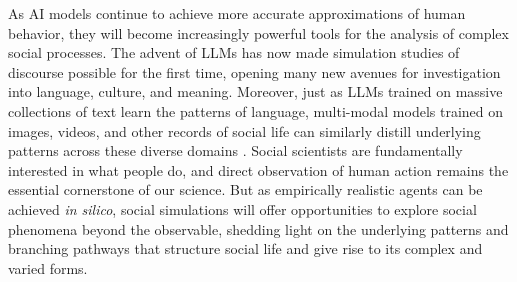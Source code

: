 \documentclass{article} %
\begin{document}
As AI models continue to achieve more accurate approximations of human
behavior, they will become increasingly powerful tools for the analysis
of complex social processes. The advent of LLMs has now made simulation
studies of discourse possible for the first time, opening many new
avenues for investigation into language, culture, and meaning. Moreover,
just as LLMs trained on massive collections of text learn the patterns
of language, multi-modal models trained on images, videos, and other
records of social life can similarly distill underlying patterns across
these diverse domains
\parencite{Guilbeault2024-wz, Ludwig2024-nl}. Social scientists are fundamentally
interested in what people do, and direct observation of human action
remains the essential cornerstone of our science. But as empirically
realistic agents can be achieved \emph{in silico}, social simulations
will offer opportunities to explore social phenomena beyond the
observable, shedding light on the underlying patterns and branching
pathways that structure social life and give rise to its complex and
varied forms.



\newpage
\normalsize
\printbibliography


\end{document}
